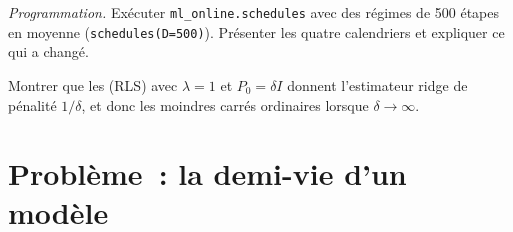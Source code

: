 \begin{exercise}[$\star\star\star$]\label{exo:ml:online-learning-and-drift:7}
\emph{Programmation.} Exécuter \texttt{ml\_online.schedules} avec des régimes de 500 étapes en moyenne (\texttt{schedules(D=500)}). Présenter les
quatre calendriers et expliquer ce qui a changé.
\end{exercise}

\begin{exercise}[$\star\star\star$]\label{exo:ml:online-learning-and-drift:8}
Montrer que les  (RLS) avec $\lambda = 1$ et $P_0 = \delta I$ donnent l'estimateur ridge de pénalité $1/\delta$, et donc les moindres carrés ordinaires
lorsque $\delta\to\infty$.
\end{exercise}

\section{Problème~: la demi-vie d'un modèle}

